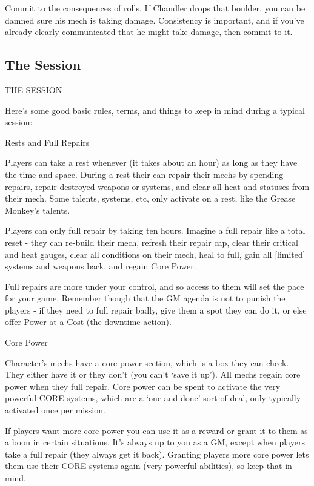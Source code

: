 Commit to the consequences of rolls. If Chandler drops that boulder, you can be damned sure  
his mech is taking damage. Consistency is important, and if you’ve already clearly  
communicated that he might take damage, then commit to it.
 
\subsection{The Session}
                                            THE SESSION  

Here’s some good basic rules, terms, and things to keep in mind during a typical session:
 

                                         Rests and Full Repairs
 

Players can take a rest whenever (it takes about an hour) as long as they have the time and  
space. During a rest their can repair their mechs by spending repairs, repair destroyed weapons  
or systems, and clear all heat and statuses from their mech. Some talents, systems, etc, only  
activate on a rest, like the Grease Monkey’s talents.
 

Players can only full repair by taking ten hours. Imagine a full repair like a total reset - they can  
re-build their mech, refresh their repair cap, clear their critical and heat gauges, clear all  
conditions on their mech, heal to full, gain all [limited] systems and weapons back, and regain  
Core Power.
 

Full repairs are more under your control, and so access to them will set the pace for your game.  
Remember though that the GM agenda is not to punish the players - if they need to full repair  
badly, give them a spot they can do it, or else offer Power at a Cost (the downtime action).
 

                                                Core Power  

Character’s mechs have a core power section, which is a box they can check. They either have  
it or they don’t (you can’t ‘save it up’). All mechs regain core power when they full repair. Core  
power can be spent to activate the very powerful CORE systems, which are a ‘one and done’  
sort of deal, only typically activated once per mission.
 

If players want more core power you can use it as a reward or grant it to them as a boon in  
certain situations. It’s always up to you as a GM, except when players take a full repair (they  
always get it back). Granting players more core power lets them use their CORE systems again  
(very powerful abilities), so keep that in mind.
 

